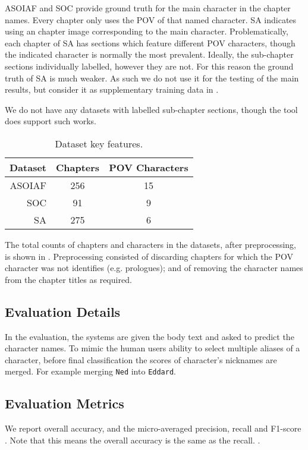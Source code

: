 \documentclass[11pt,a4paper]{article}
\newcommand{\parencite}{\citep}
\begin{document}
ASOIAF and SOC provide ground truth for the main character in the chapter names.
Every chapter only uses the POV of that named character.
SA indicates using an chapter image corresponding to the main character.
Problematically, each chapter of SA has sections which feature different POV characters, though the indicated character is normally the most prevalent.
Ideally, the sub-chapter sections individually labelled, however they are not.
For this reason the ground truth of SA is much weaker.
As such we do not use it for the testing of the main results,
but consider it as supplementary training data in .

We do not have any datasets with labelled sub-chapter sections, though the tool does support such works.


\begin{table}
	\begin{tabular}{rcc}
		Dataset & Chapters & POV Characters\\
		\toprule
		ASOIAF  & 256	&	15\\
		SOC		& 91	&	9\\
		SA		& 275	&	6
	\end{tabular}
	\caption{Dataset key features. \label{tbl:datasets}}
\end{table}

The total counts of chapters and characters in the datasets, after preprocessing, is shown in .
Preprocessing consisted of  discarding chapters for which the POV character was not identifies (e.g. prologues); and of removing the character names from the chapter titles as required.

\subsection{Evaluation Details}
In the evaluation, the systems are given the body text and asked to predict the character names.
To mimic the human users ability to select multiple aliases of a character, before final classification the scores of character's nicknames are merged.
For example merging \texttt{Ned} into \texttt{Eddard}.

\subsection{Evaluation Metrics}
We report overall accuracy, and the micro-averaged precision, recall and F1-score \parencite{sokolova2009systematica}.
Note that this means the overall accuracy is the same as the recall.
.
\end{document}

